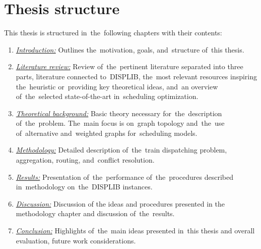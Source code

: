 \section{Thesis structure}
\begin{minipage}{\textwidth}
This thesis is structured in~the~following chapters with their contents:

\begin{enumerate}
	\item \hyperref[chap:intro]{\emph{Introduction:}} Outlines the~motivation, goals, and~structure of~this thesis.
	\item \hyperref[chap:lit_rev]{\emph{Literature review:}} Review of~the~pertinent literature separated into three parts, literature connected to~DISPLIB, the~most relevant resources inspiring the~heuristic or~providing key theoretical ideas, and~an overview of~the~selected state-of-the-art in~scheduling optimization.
	\item \hyperref[chap:theor]{\emph{Theoretical background:}} Basic theory necessary for~the~description of~the~problem. The~main focus is on~graph topology and~the~use of~alternative and~weighted graphs for~scheduling models.
	\item \hyperref[chap:method]{\emph{Methodology:}} Detailed description of~the~train dispatching problem, aggregation, routing, and~conflict resolution.
	\item \hyperref[chap:results]{\emph{Results:}} Presentation of~the~performance of~the~procedures described in~methodology on~the~DISPLIB instances.
	\item \hyperref[chap:discuss]{\emph{Discussion:}} Discussion of the ideas and procedures presented in the methodology chapter and discussion of~the~results.
	\item \hyperref[chap:concl]{\emph{Conclusion:}} Highlights of~the~main ideas presented in~this thesis and overall evaluation, future work considerations.
\end{enumerate}
\end{minipage}


